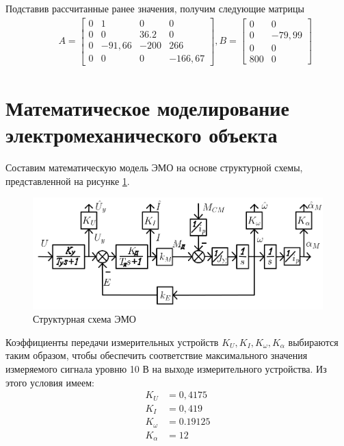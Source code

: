 \documentclass[fleqn, a4paper, 11pt, russian]{article}
\begin{document}
	Подставив рассчитанные ранее значения, получим следующие матрицы
	\begin{align}
		&&A = 
		\begin{bmatrix}
			0 & 1 & 0 & 0\\
			0 & 0 & 36.2 & 0\\
			0 & -91,66 & -200 & 266\\
			0 & 0 & 0 & -166,67
		\end{bmatrix}, B =
		\begin{bmatrix}
			0 & 0\\
			0 & -79,99\\
			0 & 0\\
			800 & 0
		\end{bmatrix}
	\end{align}
	\clearpage
	\section{Математическое моделирование электромеханического объекта}
	Составим математическую модель ЭМО на основе структурной схемы, представленной на рисунке \ref{fullScheme}.
	\begin{figure}[ht!]
		\centering
		\includegraphics[width = \textwidth]{fullScheme}
		\caption{Структурная схема ЭМО}
		\label{fullScheme}
	\end{figure}
	
	Коэффициенты передачи измерительных устройств $K_U, K_I, K_\omega, K_\alpha$ выбираются таким образом, чтобы обеспечить соответствие максимального значения измеряемого сигнала уровню 10 В на выходе измерительного устройства. Из этого условия имеем:
	\begin{align}
		K_U &= 0,4175\\
		K_I &= 0,419\\
		K_\omega &= 0.19125\\
		K_\alpha &= 12
	\end{align}
	
\end{document}
